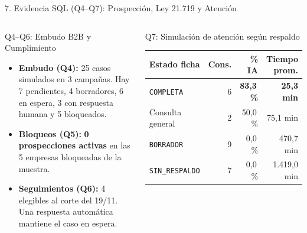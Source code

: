 \documentclass[aspectratio=169,10pt]{beamer}
\begin{document}
\begin{frame}{7. Evidencia SQL (Q4--Q7): Prospección, Ley 21.719 y Atención}
\begin{columns}[T]
\begin{block}{Q4--Q6: Embudo B2B y Cumplimiento}
\footnotesize
\begin{itemize}
    \item \textbf{Embudo (Q4):} 25 casos simulados en 3 campañas. Hay 7 pendientes, 4 borradores, 6 en espera, 3 con respuesta humana y 5 bloqueados.
    \item \textbf{Bloqueos (Q5):} \textbf{0 prospecciones activas} en las 5 empresas bloqueadas de la muestra.
    \item \textbf{Seguimientos (Q6):} 4 elegibles al corte del 19/11. Una respuesta automática mantiene el caso en espera.
\end{itemize}
\end{block}
\begin{block}{Q7: Simulación de atención según respaldo}
\scriptsize
\begin{tabular}{lrrr}
\toprule
\textbf{Estado ficha} & \textbf{Cons.} & \textbf{\% IA} & \textbf{Tiempo prom.} \\
\midrule
\texttt{COMPLETA} & 6 & \textbf{83,3\,\%} & \textbf{25,3 min} \\
Consulta general & 2 & 50,0\,\% & 75,1 min \\
\texttt{BORRADOR} & 9 & 0,0\,\% & 470,7 min \\
\texttt{SIN\_RESPALDO} & 7 & 0,0\,\% & 1.419,0 min \\
\bottomrule
\end{tabular}
\vspace{4pt}
\end{block}
\end{columns}
\end{frame}
\end{document}
